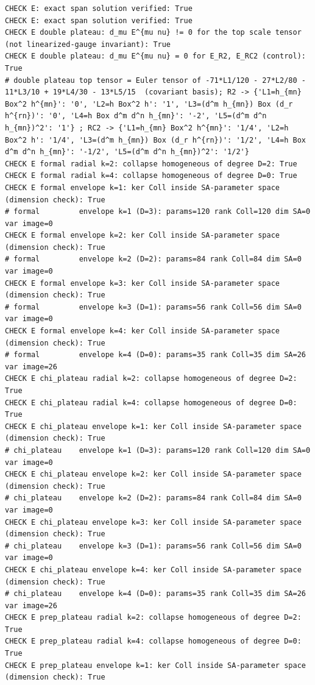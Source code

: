 \documentclass{article}
\theoremstyle{remark}
\begin{document}
\begin{lstlisting}
CHECK E: exact span solution verified: True
CHECK E: exact span solution verified: True
CHECK E double plateau: d_mu E^{mu nu} != 0 for the top scale tensor (not linearized-gauge invariant): True
CHECK E double plateau: d_mu E^{mu nu} = 0 for E_R2, E_RC2 (control): True
# double plateau top tensor = Euler tensor of -71*L1/120 - 27*L2/80 - 11*L3/10 + 19*L4/30 - 13*L5/15  (covariant basis); R2 -> {'L1=h_{mn} Box^2 h^{mn}': '0', 'L2=h Box^2 h': '1', 'L3=(d^m h_{mn}) Box (d_r h^{rn})': '0', 'L4=h Box d^m d^n h_{mn}': '-2', 'L5=(d^m d^n h_{mn})^2': '1'} ; RC2 -> {'L1=h_{mn} Box^2 h^{mn}': '1/4', 'L2=h Box^2 h': '1/4', 'L3=(d^m h_{mn}) Box (d_r h^{rn})': '1/2', 'L4=h Box d^m d^n h_{mn}': '-1/2', 'L5=(d^m d^n h_{mn})^2': '1/2'}
CHECK E formal radial k=2: collapse homogeneous of degree D=2: True
CHECK E formal radial k=4: collapse homogeneous of degree D=0: True
CHECK E formal envelope k=1: ker Coll inside SA-parameter space (dimension check): True
# formal         envelope k=1 (D=3): params=120 rank Coll=120 dim SA=0 var image=0 
CHECK E formal envelope k=2: ker Coll inside SA-parameter space (dimension check): True
# formal         envelope k=2 (D=2): params=84 rank Coll=84 dim SA=0 var image=0 
CHECK E formal envelope k=3: ker Coll inside SA-parameter space (dimension check): True
# formal         envelope k=3 (D=1): params=56 rank Coll=56 dim SA=0 var image=0 
CHECK E formal envelope k=4: ker Coll inside SA-parameter space (dimension check): True
# formal         envelope k=4 (D=0): params=35 rank Coll=35 dim SA=26 var image=26 
CHECK E chi_plateau radial k=2: collapse homogeneous of degree D=2: True
CHECK E chi_plateau radial k=4: collapse homogeneous of degree D=0: True
CHECK E chi_plateau envelope k=1: ker Coll inside SA-parameter space (dimension check): True
# chi_plateau    envelope k=1 (D=3): params=120 rank Coll=120 dim SA=0 var image=0 
CHECK E chi_plateau envelope k=2: ker Coll inside SA-parameter space (dimension check): True
# chi_plateau    envelope k=2 (D=2): params=84 rank Coll=84 dim SA=0 var image=0 
CHECK E chi_plateau envelope k=3: ker Coll inside SA-parameter space (dimension check): True
# chi_plateau    envelope k=3 (D=1): params=56 rank Coll=56 dim SA=0 var image=0 
CHECK E chi_plateau envelope k=4: ker Coll inside SA-parameter space (dimension check): True
# chi_plateau    envelope k=4 (D=0): params=35 rank Coll=35 dim SA=26 var image=26 
CHECK E prep_plateau radial k=2: collapse homogeneous of degree D=2: True
CHECK E prep_plateau radial k=4: collapse homogeneous of degree D=0: True
CHECK E prep_plateau envelope k=1: ker Coll inside SA-parameter space (dimension check): True

\end{lstlisting}
\end{document}
